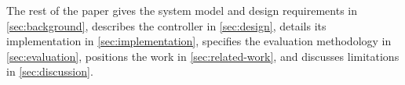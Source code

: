 The rest of the paper gives the system model and design requirements in \cref{sec:background}, describes the controller in \cref{sec:design}, details its implementation in \cref{sec:implementation}, specifies the evaluation methodology in \cref{sec:evaluation}, positions the work in \cref{sec:related-work}, and discusses limitations in \cref{sec:discussion}.
